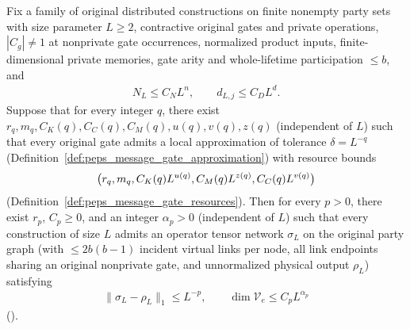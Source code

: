 \begin{lemma}
    \label{thm:peps_uniform_original_message_compression}
    \leanok
    Fix a family of original distributed constructions on finite nonempty party sets with size parameter $L\ge2$, contractive original gates and private operations, $|C_g|\ne1$ at nonprivate gate occurrences, normalized product inputs, finite-dimensional private memories, gate arity and whole-lifetime participation $\le b$, and
    \begin{align}
        N_L\le C_NL^n,\qquad d_{L,j}\le C_DL^d.
        \label{eq:peps_uniform_msg_poly_inputs}
    \end{align}
    Suppose that for every integer $q$, there exist $r_q,m_q,C_K(q),C_C(q),C_M(q),u(q),v(q),z(q)$ (independent of $L$) such that every original gate admits a local approximation of tolerance $\delta=L^{-q}$ (Definition~\ref{def:peps_message_gate_approximation}) with resource bounds
    \begin{align}
        \bigl(r_q,m_q,C_K(q)L^{u(q)},C_M(q)L^{z(q)},C_C(q)L^{v(q)}\bigr)
        \notag
    \end{align}
    (Definition~\ref{def:peps_message_gate_resources}). Then for every $p>0$, there exist $r_p$, $C_p\ge0$, and an integer $\alpha_p>0$ (independent of $L$) such that every construction of size $L$ admits an operator tensor network $\sigma_L$ on the original party graph (with $\le 2b(b-1)$ incident virtual links per node, all link endpoints sharing an original nonprivate gate, and unnormalized physical output $\rho_L$) satisfying
    \begin{align}
        \lVert\sigma_L-\rho_L\rVert_1\le L^{-p},
        \qquad \dim\mathcal V_e\le C_pL^{\alpha_p}
        \label{eq:peps_uniform_msg_compression_bound}
    \end{align}
    (\cite[Theorem~5.2]{OpenAI2026PolynomialPEPS}).
\end{lemma}
